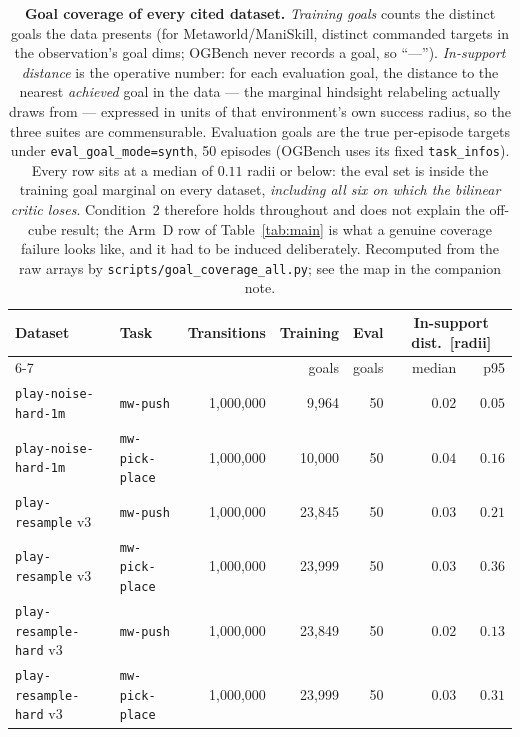 \documentclass[10pt]{article}
\begin{document}
\begin{table}[h]\centering
\caption{\textbf{Goal coverage of every cited dataset.} \emph{Training goals} counts the
distinct goals the data presents (for Metaworld/ManiSkill, distinct commanded targets in the
observation's goal dims; OGBench never records a goal, so ``---''). \emph{In-support
distance} is the operative number: for each evaluation goal, the distance to the nearest
\emph{achieved} goal in the data --- the marginal hindsight relabeling actually draws from
--- expressed in units of that environment's own success radius, so the three suites are
commensurable. Evaluation goals are the true per-episode targets under
\texttt{eval\_goal\_mode=synth}, 50 episodes (OGBench uses its fixed \texttt{task\_infos}).
Every row sits at a median of $0.11$ radii or below: the eval set is inside the training
goal marginal on every dataset, \emph{including all six on which the bilinear critic loses}.
Condition~2 therefore holds throughout and does not explain the off-cube result; the Arm~D
row of Table~\ref{tab:main} is what a genuine coverage failure looks like, and it had to be
induced deliberately. Recomputed from the raw arrays by
\texttt{scripts/goal\_coverage\_all.py}; see the map in the companion note.}
\label{tab:coverage}
\setlength{\tabcolsep}{6pt}
\begin{tabular}{ll rrr rr}
\toprule
\multirow{2}{*}{Dataset} & \multirow{2}{*}{Task} & \multirow{2}{*}{Transitions}
 & Training & Eval & \multicolumn{2}{c}{In-support dist.\ [radii]} \\
\cmidrule(l){6-7}
 & & & goals & goals & median & p95 \\
\midrule
\texttt{play-noise-hard-1m} & \texttt{mw-push} & 1{,}000{,}000 & 9{,}964 & 50 & $0.02$ & $0.05$ \\
\texttt{play-noise-hard-1m} & \texttt{mw-pick-place} & 1{,}000{,}000 & 10{,}000 & 50 & $0.04$ & $0.16$ \\
\texttt{play-resample} v3 & \texttt{mw-push} & 1{,}000{,}000 & 23{,}845 & 50 & $0.03$ & $0.21$ \\
\texttt{play-resample} v3 & \texttt{mw-pick-place} & 1{,}000{,}000 & 23{,}999 & 50 & $0.03$ & $0.36$ \\
\texttt{play-resample-hard} v3 & \texttt{mw-push} & 1{,}000{,}000 & 23{,}849 & 50 & $0.02$ & $0.13$ \\
\texttt{play-resample-hard} v3 & \texttt{mw-pick-place} & 1{,}000{,}000 & 23{,}999 & 50 & $0.03$ & $0.31$ \\

\end{tabular}
\end{table}
\end{document}
